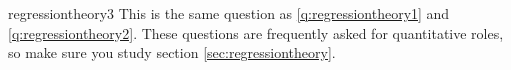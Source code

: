 \begin{answer}{regressiontheory3}
This is the same question as \ref{q:regressiontheory1} and \ref{q:regressiontheory2}.
These questions are frequently asked for quantitative roles, so make sure you study section \ref{sec:regressiontheory}.
\end{answer}
